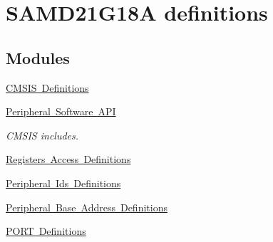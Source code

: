 \hypertarget{group___s_a_m_d21_g18_a__definitions}{}\section{S\+A\+M\+D21\+G18A definitions}
\label{group___s_a_m_d21_g18_a__definitions}
\subsection*{Modules}
\begin{DoxyCompactItemize}
\item 
\mbox{\hyperlink{group___s_a_m_d21_g18_a__cmsis}{C\+M\+S\+I\+S Definitions}}
\item 
\mbox{\hyperlink{group___s_a_m_d21_g18_a__api}{Peripheral Software A\+PI}}
\begin{DoxyCompactList}\small\item\em C\+M\+S\+IS includes. \end{DoxyCompactList}\item 
\mbox{\hyperlink{group___s_a_m_d21_g18_a__reg}{Registers Access Definitions}}
\item 
\mbox{\hyperlink{group___s_a_m_d21_g18_a__id}{Peripheral Ids Definitions}}
\item 
\mbox{\hyperlink{group___s_a_m_d21_g18_a__base}{Peripheral Base Address Definitions}}
\item 
\mbox{\hyperlink{group___s_a_m_d21_g18_a__port}{P\+O\+R\+T Definitions}}
\end{DoxyCompactItemize}
